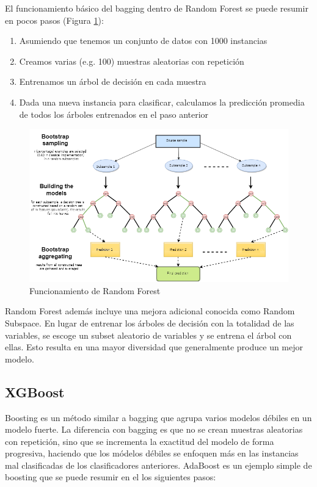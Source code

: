 El funcionamiento básico del bagging dentro de Random Forest se puede resumir en pocos pasos (Figura \ref{fig:rf}):

\begin{enumerate}
    \item Asumiendo que tenemos un conjunto de datos con 1000 instancias
    \item Creamos varias (e.g. 100) muestras aleatorias con repetición
    \item Entrenamos un árbol de decisión en cada muestra
    \item Dada una nueva instancia para clasificar, calculamos la predicción promedia de todos los árboles entrenados en el paso anterior
\end{enumerate}

\begin{figure}
    \centering
    \caption{Funcionamiento de Random Forest}
    \label{fig:rf}
    \includegraphics[width=\linewidth]{graficos/rf.png}
\end{figure}

Random Forest además incluye una mejora adicional conocida como Random Subspace. En lugar de entrenar los árboles de decisión con la totalidad de las variables, se escoge un subset aleatorio de variables y se entrena el árbol con ellas. Esto resulta en una mayor diversidad que generalmente produce un mejor modelo.

\subsection{XGBoost}

Boosting es un método similar a bagging que agrupa varios modelos débiles en un modelo fuerte. La diferencia con bagging es que no se crean muestras aleatorias con repetición, sino que se incrementa la exactitud del modelo de forma progresiva, haciendo que los módelos débiles se enfoquen más en las instancias mal clasificadas de los clasificadores anteriores. AdaBoost es un ejemplo simple de boosting que se puede resumir en el los siguientes pasos:

